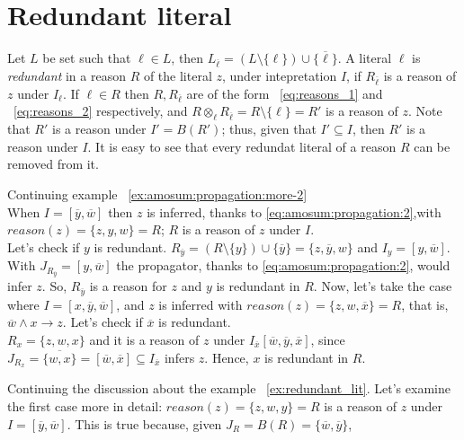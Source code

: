 \section{Redundant literal}
\label{sec:redundant_literal}
Let $L$ be set such that $\ell \in L$,
then $L_{\overline{\ell}} = (L \setminus \{\ell\}) \cup \{\overline{\ell}\}$.
A literal $\ell$ is \textit{redundant} in a reason $R$ of the literal $z$, under intepretation $I$, 
if $R_{\overline{\ell}}$ is a reason of $z$ under $I_{\ell}$.
If $\ell \in R$ then  $R,R_{\overline{\ell}}$ are of the form ~\ref{eq:reasons_1} and 
~\ref{eq:reasons_2} respectively,
and $R \otimes_{\ell} R_{\overline{\ell}} = R \setminus \{\ell\} = R'$ is a reason of $z$.
Note that $R'$ is a reason under  $I' = B(R')$; 
thus, given that $I' \subseteq I$, then $R'$ is a reason under $I$.
It is easy to see that every redundat literal of a reason $R$ can be removed from it.
\begin{example}{Continuing example ~\ref{ex:amosum:propagation:more-2}}\\
    \label{ex:redundant_lit}
    When $I = [\overline{y}, \overline{w}]$ then $z$ is inferred,
    thanks to \eqref{eq:amosum:propagation:2},with $\mathit{reason}(z) = \{z,y,w\} = R$;
    $R$ is a reason of $z$ under $I$.\\
    Let's check if $y$ is redundant.
    $R_{\overline{y}} = (R \setminus \{y\}) \cup \{\overline{y}\} = \{z,\overline{y},w\}$ and $I_{y} = [y,\overline{w}]$.
    With $J_{R_{\overline{y}}} = [y,\overline{w}]$ the propagator, thanks to \eqref{eq:amosum:propagation:2}, 
    would infer $z$.
    So, $R_{\overline{y}}$ is a reason for $z$
    and $y$ is redundant in $R$.
    Now, let's take the case where $I = [x, \overline{y}, \overline{w}]$, 
    and $z$ is inferred with $\mathit{reason}(z) = \{z, w, \overline{x}\} = R$, that is, 
    $\overline{w} \land  x \rightarrow z$.
    Let's check if $\overline{x}$ is redundant.\\
    $R_{x} = \{z, w, x\}$ and it is a reason of $z$ under $I_{\overline{x}}[\overline{w}, \overline{y},\overline{x}]$, 
    since $J_{R_x} = \overline{\{w, x\}} = [\overline{w},\overline{x}] \subseteq I_{\overline{x}}$
    infers $z$. Hence, $x$ is redundant in $R$.
\end{example}
Continuing the discussion about the example ~\ref{ex:redundant_lit}.
Let's examine the first case more in detail: $\mathit{reason}(z) = \{z, w, y\} = R $ is a 
reason of $z$ under $I = [\overline{y}, \overline{w}]$. This is true because,
given $J_R = B(R) = \{\overline{w},\overline{y}\} $,
